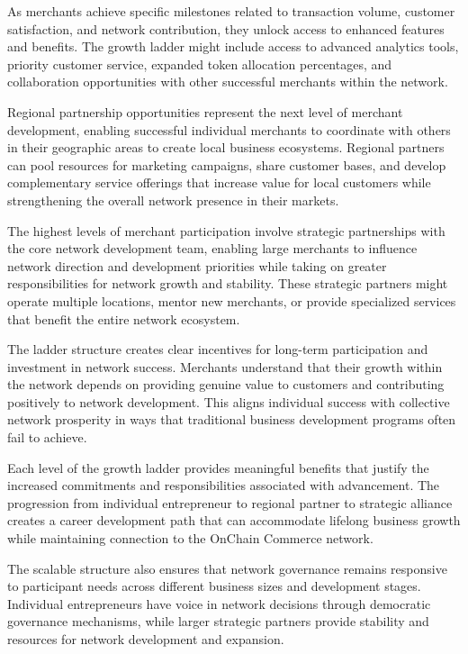 \documentclass[
  Letterpaper,
]{scrbook}
\begin{document}
As merchants achieve specific milestones related to transaction volume,
customer satisfaction, and network contribution, they unlock access to
enhanced features and benefits. The growth ladder might include access
to advanced analytics tools, priority customer service, expanded token
allocation percentages, and collaboration opportunities with other
successful merchants within the network.

Regional partnership opportunities represent the next level of merchant
development, enabling successful individual merchants to coordinate with
others in their geographic areas to create local business ecosystems.
Regional partners can pool resources for marketing campaigns, share
customer bases, and develop complementary service offerings that
increase value for local customers while strengthening the overall
network presence in their markets.

The highest levels of merchant participation involve strategic
partnerships with the core network development team, enabling large
merchants to influence network direction and development priorities
while taking on greater responsibilities for network growth and
stability. These strategic partners might operate multiple locations,
mentor new merchants, or provide specialized services that benefit the
entire network ecosystem.

The ladder structure creates clear incentives for long-term
participation and investment in network success. Merchants understand
that their growth within the network depends on providing genuine value
to customers and contributing positively to network development. This
aligns individual success with collective network prosperity in ways
that traditional business development programs often fail to achieve.

Each level of the growth ladder provides meaningful benefits that
justify the increased commitments and responsibilities associated with
advancement. The progression from individual entrepreneur to regional
partner to strategic alliance creates a career development path that can
accommodate lifelong business growth while maintaining connection to the
OnChain Commerce network.

The scalable structure also ensures that network governance remains
responsive to participant needs across different business sizes and
development stages. Individual entrepreneurs have voice in network
decisions through democratic governance mechanisms, while larger
strategic partners provide stability and resources for network
development and expansion.
\end{document}
